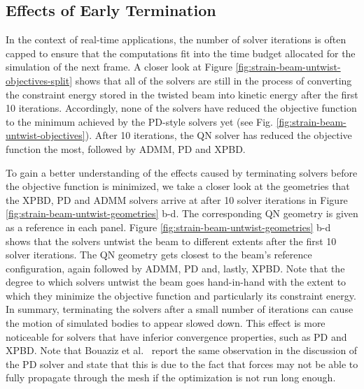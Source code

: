 \subsection{Effects of Early Termination}\label{ss:early-termination}
In the context of real-time applications, the number of solver iterations is often capped to ensure that the computations fit into the time budget allocated 
for the simulation of the next frame. A closer look at Figure \ref{fig:strain-beam-untwist-objectives-split} shows that all of the solvers are still in the process of 
converting the constraint energy stored in the twisted beam into kinetic energy after the first 10 iterations. Accordingly, none of the solvers have reduced the 
objective function to the minimum achieved by the PD-style solvers yet (see Fig. \ref{fig:strain-beam-untwist-objectives}). After 10 iterations, the QN solver has reduced 
the objective function the most, followed by ADMM, PD and XPBD. 

To gain a better understanding of the effects caused by terminating solvers before the objective function is minimized, we take a 
closer look at the geometries that the XPBD, PD and ADMM solvers arrive at after 10 solver iterations in Figure \ref{fig:strain-beam-untwist-geometries} b-d. The 
corresponding QN geometry is given as a reference in each panel. Figure \ref{fig:strain-beam-untwist-geometries} b-d shows that the solvers untwist the beam to 
different extents after the first 10 solver iterations. The QN geometry gets closest to the beam's reference configuration, again followed by ADMM, PD and, lastly, 
XPBD. Note that the degree to which solvers untwist the beam goes hand-in-hand with the extent to which they minimize the objective function and particularly its 
constraint energy. In summary, terminating the solvers after a small number of iterations can cause the motion of simulated bodies to appear slowed down. 
This effect is more noticeable for solvers that have inferior convergence properties, such as PD and XPBD. Note that Bouaziz et al.\ \cite{bouaziz2014} report 
the same observation in the discussion of the PD solver and state that this is due to the fact that forces may not be able to fully propagate through the mesh 
if the optimization is not run long enough. 

